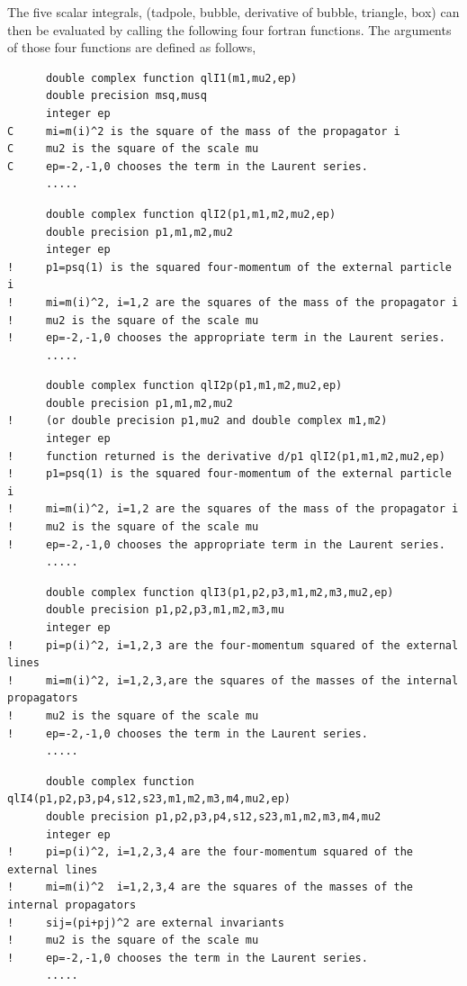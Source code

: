 \documentclass{article}
\begin{document}
The five scalar integrals, (tadpole, bubble, derivative of bubble, triangle, box) can then be
evaluated by calling the following four fortran functions.  The
arguments of those four functions are defined as follows,
\begin{verbatim}
      double complex function qlI1(m1,mu2,ep)
      double precision msq,musq
      integer ep
C     mi=m(i)^2 is the square of the mass of the propagator i 
C     mu2 is the square of the scale mu
C     ep=-2,-1,0 chooses the term in the Laurent series.
      .....
\end{verbatim}
\begin{verbatim}
      double complex function qlI2(p1,m1,m2,mu2,ep) 
      double precision p1,m1,m2,mu2
      integer ep
!     p1=psq(1) is the squared four-momentum of the external particle i 
!     mi=m(i)^2, i=1,2 are the squares of the mass of the propagator i 
!     mu2 is the square of the scale mu
!     ep=-2,-1,0 chooses the appropriate term in the Laurent series.
      .....
\end{verbatim}
\begin{verbatim}
      double complex function qlI2p(p1,m1,m2,mu2,ep) 
      double precision p1,m1,m2,mu2 
!     (or double precision p1,mu2 and double complex m1,m2)
      integer ep
!     function returned is the derivative d/p1 qlI2(p1,m1,m2,mu2,ep)
!     p1=psq(1) is the squared four-momentum of the external particle i 
!     mi=m(i)^2, i=1,2 are the squares of the mass of the propagator i 
!     mu2 is the square of the scale mu
!     ep=-2,-1,0 chooses the appropriate term in the Laurent series.
      .....
\end{verbatim}
\begin{verbatim}
      double complex function qlI3(p1,p2,p3,m1,m2,m3,mu2,ep)
      double precision p1,p2,p3,m1,m2,m3,mu
      integer ep
!     pi=p(i)^2, i=1,2,3 are the four-momentum squared of the external lines
!     mi=m(i)^2, i=1,2,3,are the squares of the masses of the internal propagators
!     mu2 is the square of the scale mu
!     ep=-2,-1,0 chooses the term in the Laurent series.
      .....
\end{verbatim}
\begin{verbatim}
      double complex function qlI4(p1,p2,p3,p4,s12,s23,m1,m2,m3,m4,mu2,ep)
      double precision p1,p2,p3,p4,s12,s23,m1,m2,m3,m4,mu2
      integer ep
!     pi=p(i)^2, i=1,2,3,4 are the four-momentum squared of the external lines
!     mi=m(i)^2  i=1,2,3,4 are the squares of the masses of the internal propagators
!     sij=(pi+pj)^2 are external invariants
!     mu2 is the square of the scale mu
!     ep=-2,-1,0 chooses the term in the Laurent series.
      .....
\end{verbatim}
\end{document}
